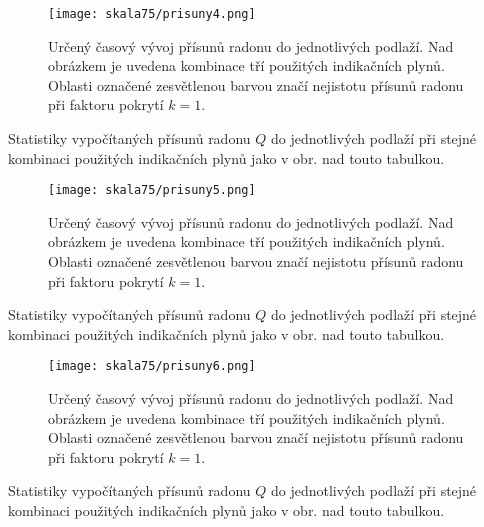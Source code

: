 \begin{figure}[H]
    \centering
    \texttt{[image: skala75/prisuny4.png]}
    \caption{Určený časový vývoj přísunů radonu do jednotlivých podlaží. Nad obrázkem je uvedena kombinace tří použitých indikačních plynů. Oblasti označené zesvětlenou barvou značí nejistotu přísunů radonu při faktoru pokrytí $k=1$.}
    \label{fig:skala75_prisuny4}
\end{figure}
\begin{table}[H]
    \centering
    \caption{Statistiky vypočítaných přísunů radonu $Q$ do jednotlivých podlaží při stejné kombinaci použitých indikačních plynů jako v obr. nad touto tabulkou.}
    \label{tab:skala75_prisuny4}
    
\end{table}

\begin{figure}[H]
    \centering
    \texttt{[image: skala75/prisuny5.png]}
    \caption{Určený časový vývoj přísunů radonu do jednotlivých podlaží. Nad obrázkem je uvedena kombinace tří použitých indikačních plynů. Oblasti označené zesvětlenou barvou značí nejistotu přísunů radonu při faktoru pokrytí $k=1$.}
    \label{fig:skala75_prisuny5}
\end{figure}
\begin{table}[H]
    \centering
    \caption{Statistiky vypočítaných přísunů radonu $Q$ do jednotlivých podlaží při stejné kombinaci použitých indikačních plynů jako v obr. nad touto tabulkou.}
    \label{tab:skala75_prisuny5}
    
\end{table}

\begin{figure}[H]
    \centering
    \texttt{[image: skala75/prisuny6.png]}
    \caption{Určený časový vývoj přísunů radonu do jednotlivých podlaží. Nad obrázkem je uvedena kombinace tří použitých indikačních plynů. Oblasti označené zesvětlenou barvou značí nejistotu přísunů radonu při faktoru pokrytí $k=1$.}
    \label{fig:skala75_prisuny6}
\end{figure}
\begin{table}[H]
    \centering
    \caption{Statistiky vypočítaných přísunů radonu $Q$ do jednotlivých podlaží při stejné kombinaci použitých indikačních plynů jako v obr. nad touto tabulkou.}
    \label{tab:skala75_prisuny6}
    
\end{table}

